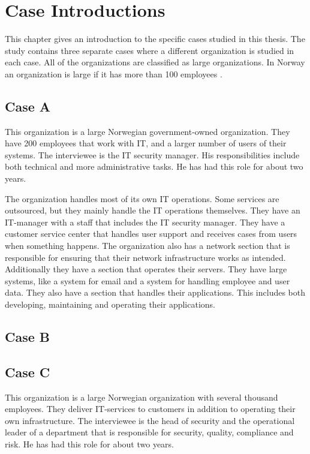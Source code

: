 \chapter{Case Introductions}
\label{chp:CaseIntroductions}
This chapter gives an introduction to the specific cases studied in this thesis. The study contains three separate cases where a different organization is studied in each case. All of the organizations are classified as large organizations. In Norway an organization is large if it has more than 100 employees \cite{SMB}.

\section{Case A}
This organization is a large Norwegian government-owned organization. They have 200 employees that work with IT, and a larger number of users of their systems. The interviewee is the IT security manager. His responsibilities include both technical and more administrative tasks. He has had this role for about two years.

The organization handles most of its own IT operations. Some services are outsourced, but they mainly handle the IT operations themselves. They have an IT-manager with a staff that includes the IT security manager. They have a customer service center %
that handles user support and receives cases from users when something happens. The organization also has a network section that is responsible for ensuring that their network infrastructure works as intended. Additionally they have  a section that operates their servers. They have large systems, like a system for email and a system for handling employee and user data. They also have a section that handles their applications. This includes both developing, maintaining and operating their applications.

\section{Case B}

\section{Case C}
This organization is a large Norwegian organization with several thousand employees. They deliver IT-services to customers in addition to operating their own infrastructure. The interviewee is the head of security and the operational leader of a department that is responsible for security, quality, compliance and risk. He has had this role for about two years.

